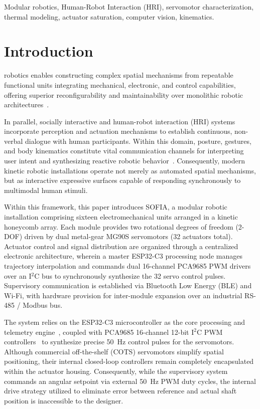 \documentclass[lettersize,journal]{IEEEtran}
\begin{document}
	\begin{IEEEkeywords}
		Modular robotics, Human-Robot Interaction (HRI), servomotor characterization, thermal modeling, actuator saturation, computer vision, kinematics.
	\end{IEEEkeywords}
	
	\section{Introduction}
	\label{sec:introduction}
	
	 robotics enables constructing complex spatial mechanisms from repeatable functional units integrating mechanical, electronic, and control capabilities, offering superior reconfigurability and maintainability over monolithic robotic architectures~\cite{seo2019modular}.
	
	In parallel, socially interactive and human-robot interaction (HRI) systems incorporate perception and actuation mechanisms to establish continuous, non-verbal dialogue with human participants. Within this domain, posture, gestures, and body kinematics constitute vital communication channels for interpreting user intent and synthesizing reactive robotic behavior~\cite{fong2003social}. Consequently, modern kinetic robotic installations operate not merely as automated spatial mechanisms, but as interactive expressive surfaces capable of responding synchronously to multimodal human stimuli.
	
	Within this framework, this paper introduces SOFIA, a modular robotic installation comprising sixteen electromechanical units arranged in a kinetic honeycomb array. Each module provides two rotational degrees of freedom (2-DOF) driven by dual metal-gear MG90S servomotors (32 actuators total). Actuator control and signal distribution are organized through a centralized electronic architecture, wherein a master ESP32-C3 processing node manages trajectory interpolation and commands dual 16-channel PCA9685 PWM drivers over an I$^2$C bus to synchronously synthesize the 32 servo control pulses. Supervisory communication is established via Bluetooth Low Energy (BLE) and Wi-Fi, with hardware provision for inter-module expansion over an industrial RS-485 / Modbus bus.
	
	The system relies on the ESP32-C3 microcontroller as the core processing and telemetry engine~\cite{espressif2024esp32c3}, coupled with PCA9685 16-channel 12-bit I$^2$C PWM controllers~\cite{nxp2015pca9685} to synthesize precise 50~Hz control pulses for the servomotors. Although commercial off-the-shelf (COTS) servomotors simplify spatial positioning, their internal closed-loop controllers remain completely encapsulated within the actuator housing. Consequently, while the supervisory system commands an angular setpoint via external 50~Hz PWM duty cycles, the internal drive strategy utilized to eliminate error between reference and actual shaft position is inaccessible to the designer.
	
\end{document}
